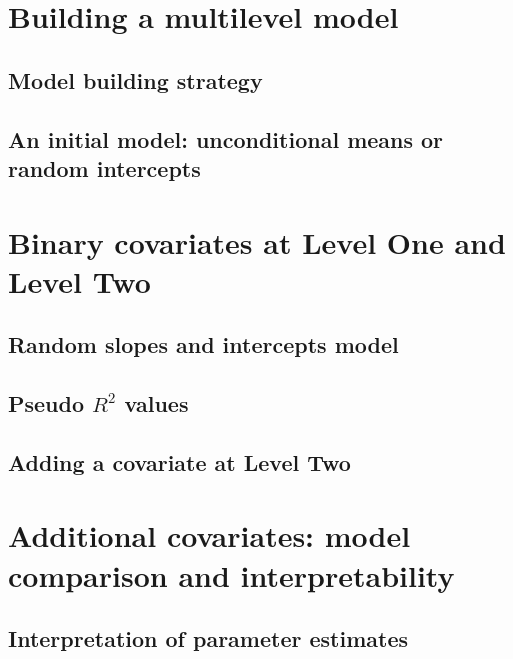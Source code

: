 \documentclass[
]{krantz}
\begin{document}
\hypertarget{sec:buildmodel}{%
\section{Building a multilevel model}\label{sec:buildmodel}}

\hypertarget{buildstrategy}{%
\subsection{Model building strategy}\label{buildstrategy}}

\hypertarget{modela}{%
\subsection{An initial model: unconditional means or random intercepts}\label{modela}}

\hypertarget{modelb}{%
\section{Binary covariates at Level One and Level Two}\label{modelb}}

\hypertarget{randomslopeandint}{%
\subsection{Random slopes and intercepts model}\label{randomslopeandint}}

\hypertarget{pseudoR2}{%
\subsection{\texorpdfstring{Pseudo \(R^2\) values}{Pseudo R\^{}2 values}}\label{pseudoR2}}

\hypertarget{modelc}{%
\subsection{Adding a covariate at Level Two}\label{modelc}}

\hypertarget{sec:modeld}{%
\section{Additional covariates: model comparison and interpretability}\label{sec:modeld}}

\hypertarget{interp:modeld}{%
\subsection{Interpretation of parameter estimates}\label{interp:modeld}}
\end{document}
